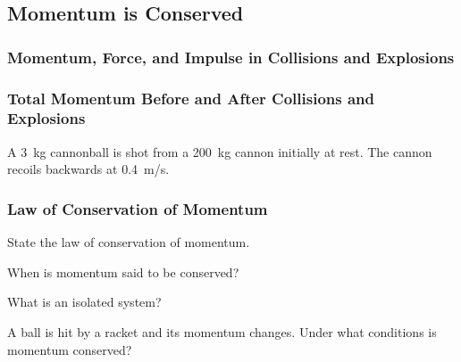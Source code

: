 \documentclass[]{exam}
\begin{document}
\clearpage

\subsection{Momentum is Conserved}

\subsubsection{Momentum, Force, and Impulse in Collisions and Explosions}

\subsubsection{Total Momentum Before and After Collisions and Explosions}

\begin{questions}
\question
A \SI{3}{kg} cannonball is shot from a \SI{200}{kg} cannon initially at rest. The cannon recoils backwards at \SI{0.4}{m/s}.

\begin{center}
\hspace{3cm}
\end{center}
\end{questions}

\subsubsection{Law of Conservation of Momentum}

\begin{questions}
\question
State the law of conservation of momentum.


\question
When is momentum said to be conserved?


\question
What is an isolated system?


\question
A ball is hit by a racket and its momentum changes. Under what conditions is momentum conserved?
\end{questions}
\end{document}
